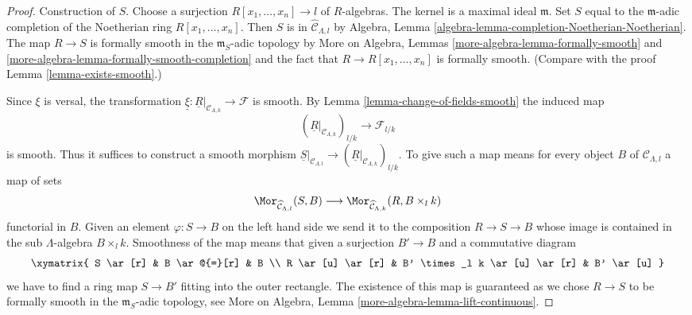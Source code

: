 \begin{proof}
Construction of $S$. Choose a surjection $R[x_1, \ldots, x_n] \to l$
of $R$-algebras. The kernel is a maximal ideal $\mathfrak m$.
Set $S$ equal to the $\mathfrak m$-adic completion of the Noetherian ring
$R[x_1, \ldots, x_n]$. Then $S$ is in $\widehat{\mathcal{C}}_{\Lambda, l}$
by Algebra, Lemma \ref{algebra-lemma-completion-Noetherian-Noetherian}.
The map $R \to S$ is formally smooth in the $\mathfrak m_S$-adic topology by
More on Algebra, Lemmas
\ref{more-algebra-lemma-formally-smooth} and
\ref{more-algebra-lemma-formally-smooth-completion}
and the fact that $R \to R[x_1, \ldots, x_n]$ is formally smooth.
(Compare with the proof Lemma \ref{lemma-exists-smooth}.)

\medskip\noindent
Since $\xi$ is versal, the transformation
$\underline{\xi} : \underline{R}|_{\mathcal{C}_{\Lambda, k}} \to \mathcal{F}$
is smooth. By Lemma \ref{lemma-change-of-fields-smooth} the induced map
$$
(\underline{R}|_{\mathcal{C}_{\Lambda, k}})_{l/k}
\longrightarrow
\mathcal{F}_{l/k}
$$
is smooth. Thus it suffices to construct a smooth morphism
$\underline{S}|_{\mathcal{C}_{\Lambda, l}} \to
(\underline{R}|_{\mathcal{C}_{\Lambda, k}})_{l/k}$.
To give such a map means for every object $B$ of $\mathcal{C}_{\Lambda, l}$
a map of sets
$$
\Mor_{\widehat{\mathcal{C}}_{\Lambda, l}}(S, B)
\longrightarrow
\Mor_{\widehat{\mathcal{C}}_{\Lambda, k}}(R, B \times_l k)
$$
functorial in $B$. Given an element $\varphi : S \to B$
on the left hand side we send it to the composition $R \to S \to B$
whose image is contained in the sub $\Lambda$-algebra $B \times_l k$.
Smoothness of the map means that given a surjection
$B' \to B$ and a commutative diagram
$$
\xymatrix{
S \ar[r] & B \ar@{=}[r] & B \\
R \ar[u] \ar[r] & B' \times_l k \ar[u] \ar[r] & B' \ar[u]
}
$$
we have to find a ring map $S \to B'$ fitting into the outer rectangle.
The existence of this map is guaranteed as we chose $R \to S$ to be
formally smooth in the $\mathfrak m_S$-adic topology, see
More on Algebra, Lemma \ref{more-algebra-lemma-lift-continuous}.
\end{proof}



























